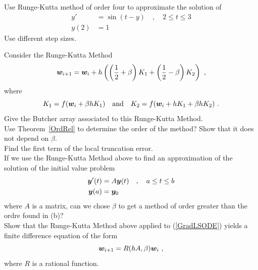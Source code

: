 \begin{question}
Use Runge-Kutta method of order four to approximate the solution of
\begin{align*}
y' &= \sin(t - y) \quad , \quad  2 \leq t \leq 3 \\
y(2) &= 1
\end{align*}
Use different step sizes.
\end{question}

\begin{question}
Consider the Runge-Kutta Method
\[
\bm{w}_{i+1} = \bm{w}_i + h\left( \left(\frac{1}{2}+\beta\right)K_1
+ \left(\frac{1}{2}-\beta\right)K_2\right) \ ,
\]
where
\[
K_1 = f(\bm{w}_i + \beta h K_1) \quad \text{and} \quad
K_2 = f(\bm{w}_i + h K_1 + \beta h K_2) \ .
\]
 Give the Butcher array associated to this Runge-Kutta
Method.\\
 Use Theorem~\ref{OrdRel} to determine the order of the
method?  Show that it does not depend on $\beta$.\\
 Find the first term of the local truncation error.\\
 If we use the Runge-Kutta Method above to find an
approximation of the solution of the initial value problem
\begin{equation}\label{GradLSODE}
\begin{split}
\bm{y}'(t) &= A \bm{y}(t) \quad , \quad a \leq t \leq b\\
\bm{y}(a) &= \bm{y}_0
\end{split}
\end{equation}
where $A$ is a \nn matrix, can we chose $\beta$ to get a method of
order greater than the ordre found in (b)? \\
 Show that the Runge-Kutta Method above applied to
(\ref{GradLSODE}) yields a finite difference equation of the form
\[
\VEC{w}_{i+1} = R(h A,\beta) \VEC{w}_i \ ,
\]
where $R$ is a rational function.
\end{question}

